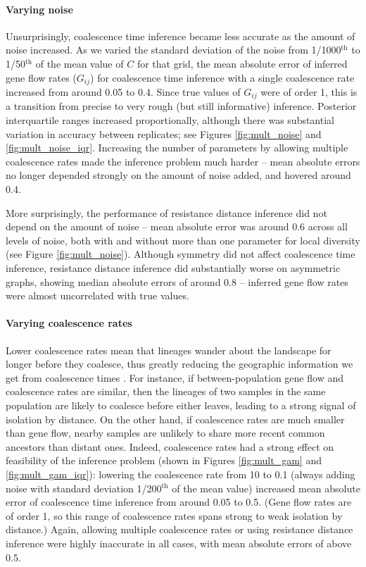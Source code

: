 \documentclass{article}
\begin{document}
\paragraph{Varying noise}
Unsurprisingly, coalescence time inference became less accurate as the amount of noise increased.
As we varied the standard deviation of the noise 
from 1/1000${}^\text{th}$ to 1/50${}^\text{th}$ of the mean value of $C$ for that grid,
the mean absolute error of inferred gene flow rates ($G_{ij}$) 
for coalescence time inference with a single coalescence rate
increased from around 0.05 to 0.4.
Since true values of $G_{ij}$ were of order 1,
this is a transition from precise to very rough (but still informative) inference.
Posterior interquartile ranges increased proportionally,
although there was substantial variation in accuracy between replicates;
see Figures \ref{fig:mult_noise} and \ref{fig:mult_noise_iqr}.
Increasing the number of parameters by allowing multiple coalescence rates
made the inference problem much harder --
mean absolute errors no longer depended strongly on the amount of noise added,
and hovered around 0.4.

More surprisingly, the performance of resistance distance inference 
did not depend on the amount of noise --
mean absolute error was around 0.6 across all levels of noise,
both with and without more than one parameter for local diversity
(see Figure \ref{fig:mult_noise}).
Although symmetry did not affect coalescence time inference,
resistance distance inference did substantially worse on asymmetric graphs,
showing median absolute errors of around 0.8 --
inferred gene flow rates were almost uncorrelated with true values.

\paragraph{Varying coalescence rates}
Lower coalescence rates mean that lineages wander about the landscape for longer
before they coalesce,  
thus greatly reducing the geographic information we get from coalescence times 
\citep{wilkins2004separationoftimescales}.
For instance, if between-population gene flow and coalescence rates are similar,
then the lineages of two samples in the same population 
are likely to coalesce before either leaves,
leading to a strong signal of isolation by distance. 
On the other hand, if coalescence rates are much smaller than gene flow,
nearby samples are unlikely to share more recent common ancestors than distant ones.
Indeed, coalescence rates had a strong effect on feasibility of the inference problem
(shown in Figures \ref{fig:mult_gam} and \ref{fig:mult_gam_iqr}):
lowering the coalescence rate from 10 to 0.1
(always adding noise with standard deviation 1/200$^\text{th}$ of the mean value)
increased mean absolute error of coalescence time inference from around 0.05 to 0.5.
(Gene flow rates are of order 1, so this range of coalescence rates
spans strong to weak isolation by distance.)
Again, allowing multiple coalescence rates
or using resistance distance inference were highly inaccurate in all cases,
with mean absolute errors of above 0.5.
\end{document}

